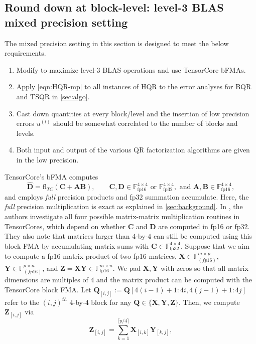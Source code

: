 \documentclass[review,onefignum,onetabnum]{siamart190516}
\newcommand{\F}{\mathbb{F}}
\newcommand{\bb}[1]{\mathbf{#1}}
\newcommand{\fl}{\mathrm{fl}}
\begin{document}
\subsection{Round down at block-level: level-3 BLAS mixed precision setting}\label{sec:mp-3}
The mixed precision setting in this section is designed to meet the below requirements.
\begin{enumerate}
	\item Modify  to maximize level-3 BLAS operations and use TensorCore bFMAs. 
	\item Apply \cref{eqn:HQR-mp} to all instances of HQR to the error analyses for BQR and TSQR in \cref{sec:algo}.
	\item Cast down quantities at every block/level and the insertion of low precision errors $u^{(l)}$ should be somewhat correlated to the number of blocks and levels. 
	\item Both input and output of the various QR factorization algorithms are given in the low precision. 
\end{enumerate}
TensorCore's bFMA computes 
\begin{equation}
\hat{\bb{D}} =\fl_{TC}(\bb{C} + \bb{A}\bb{B}),\qquad \bb{C},\bb{D}\in\F_{\text{fp16}}^{4\times 4}\text{ or }\F_{\text{fp32}}^{4\times 4},\text{ and } \bb{A},\bb{B}\in\F_{\text{fp16}}^{4\times 4},\label{eqn:bFMA}
\end{equation}
and employs \emph{full} precision products and fp32 summation accumulate.
Here, the \emph{full} precision multiplication is exact as explained in \cref{sec:background}.
In \cite{Blanchard2020}, the authors investigate all four possible matrix-matrix multiplication routines in TensorCores, which depend on whether $\bb{C}$ and $\bb{D}$ are computed in fp16 or fp32. 
They also note that matrices larger than $4$-by-$4$ can still be computed using this block FMA by accumulating matrix sums with $\bb{C}\in\F_{\text{fp32}}^{4\times 4}$.
Suppose that we aim to compute a fp16 matrix product of two fp16 matrices, $\bb{X}\in\F_{(fp16)}^{m\times p}$, $\bb{Y}\in\F_{(fp16)}^{p\times n}$, and $\bb{Z}=\bb{XY}\in\F_{\text{fp16}}^{m\times n}$.
We pad $\bb{X},\bb{Y}$ with zeros so that all matrix dimensions are multiples of $4$ and the matrix product can be computed with the TensorCore block FMA.
Let $\bb{Q}_{[i,j]}:= \bb{Q}[4(i-1)+1:4i,4(j-1)+1:4j]$ refer to the $(i,j)^{th}$ $4$-by-$4$ block for any $\bb{Q}\in\{\bb{X},\bb{Y},\bb{Z}\}$.
Then, we compute $\bb{Z}_{[i,j]}$ via \[
\bb{Z}_{[i,j]} = \sum_{k=1}^{\lceil p/4\rceil} \bb{X}_{[i,k]} \bb{Y}_{[k,j]},
\]
\end{document}
